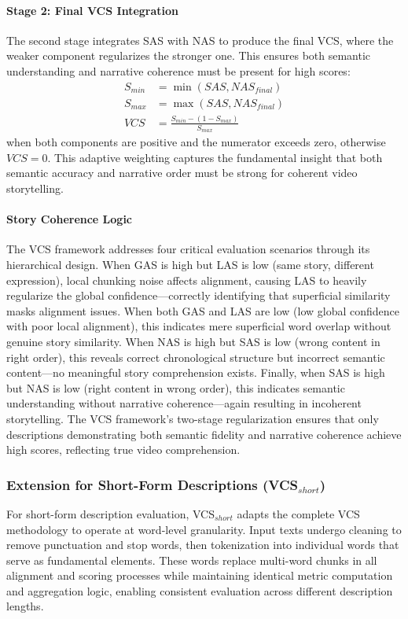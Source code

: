 \documentclass[main.tex]{subfiles}
\begin{document}
\paragraph{Stage 2: Final VCS Integration}
The second stage integrates SAS with NAS to produce the final VCS, where the weaker component regularizes the stronger one. This ensures both semantic understanding and narrative coherence must be present for high scores:
\begin{align}
S_{min} &= \min(SAS, NAS_{final}) \label{eq:s_min} \\
S_{max} &= \max(SAS, NAS_{final}) \label{eq:s_max} \\
VCS &= \frac{S_{min} - (1 - S_{max})}{S_{max}} \label{eq:vcs_final}
\end{align}
when both components are positive and the numerator exceeds zero, otherwise $VCS = 0$. This adaptive weighting captures the fundamental insight that both semantic accuracy and narrative order must be strong for coherent video storytelling.

\paragraph{Story Coherence Logic}
The VCS framework addresses four critical evaluation scenarios through its hierarchical design. When GAS is high but LAS is low (same story, different expression), local chunking noise affects alignment, causing LAS to heavily regularize the global confidence—correctly identifying that superficial similarity masks alignment issues. When both GAS and LAS are low (low global confidence with poor local alignment), this indicates mere superficial word overlap without genuine story similarity. When NAS is high but SAS is low (wrong content in right order), this reveals correct chronological structure but incorrect semantic content—no meaningful story comprehension exists. Finally, when SAS is high but NAS is low (right content in wrong order), this indicates semantic understanding without narrative coherence—again resulting in incoherent storytelling. The VCS framework's two-stage regularization ensures that only descriptions demonstrating both semantic fidelity and narrative coherence achieve high scores, reflecting true video comprehension.

\subsubsection{Extension for Short-Form Descriptions (VCS$_{short}$)}
For short-form description evaluation, VCS$_{short}$ adapts the complete VCS methodology to operate at word-level granularity. Input texts undergo cleaning to remove punctuation and stop words, then tokenization into individual words that serve as fundamental elements. These words replace multi-word chunks in all alignment and scoring processes while maintaining identical metric computation and aggregation logic, enabling consistent evaluation across different description lengths.
\end{document}
